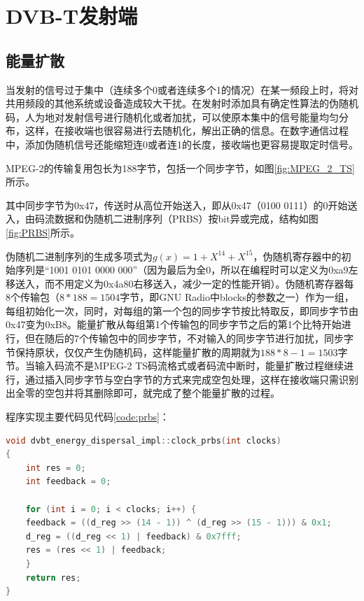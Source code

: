 \chapter{DVB-T发射端}
	\section{能量扩散}
		\par 当发射的信号过于集中（连续多个0或者连续多个1的情况）在某一频段上时，将对共用频段的其他系统或设备造成较大干扰。在发射时添加具有确定性算法的伪随机码，人为地对发射信号进行随机化或者加扰，可以使原本集中的信号能量均匀分布，这样，在接收端也很容易进行去随机化，解出正确的信息。在数字通信过程中，添加伪随机信号还能缩短连0或者连1的长度，接收端也更容易提取定时信号。
		\par MPEG-2的传输复用包长为188字节，包括一个同步字节，如图\ref{fig:MPEG_2_TS}所示。
		
		\par 其中同步字节为0x47，传送时从高位开始送入，即从0x47（0100 0111）的0开始送入，由码流数据和伪随机二进制序列（PRBS）按bit异或完成，结构如图\ref{fig:PRBS}所示。
		
		\par 伪随机二进制序列的生成多项式为$g(x)=1+X^{14}+X^{15}$，伪随机寄存器中的初始序列是“1001 0101 0000 000”（因为最后为全0，所以在编程时可以定义为0xa9左移送入，而不用定义为0x4a80右移送入，减少一定的性能开销）。伪随机寄存器每8个传输包（$8*188=1504$字节，即GNU Radio中blocks的参数之一）作为一组，每组初始化一次，同时，对每组的第一个包的同步字节按比特取反，即同步字节由0x47变为0xB8。能量扩散从每组第1个传输包的同步字节之后的第1个比特开始进行，但在随后的7个传输包中的同步字节，不对输入的同步字节进行加扰，同步字节保持原状，仅仅产生伪随机码，这样能量扩散的周期就为$188*8-1=1503$字节。当输入码流不是MPEG-2 TS码流格式或者码流中断时，能量扩散过程继续进行，通过插入同步字节与空白字节的方式来完成空包处理，这样在接收端只需识别出全零的空包并将其删除即可，就完成了整个能量扩散的过程。
		\par 程序实现主要代码见代码\ref{code:prbs}：
		\begin{lstlisting}[caption = {能量扩散}, label = {code:prbs}, language = C++ ]
void dvbt_energy_dispersal_impl::clock_prbs(int clocks)
{
	int res = 0;
	int feedback = 0;

	for (int i = 0; i < clocks; i++) {
	feedback = ((d_reg >> (14 - 1)) ^ (d_reg >> (15 - 1))) & 0x1;
	d_reg = ((d_reg << 1) | feedback) & 0x7fff;
	res = (res << 1) | feedback;
	}
	return res;
}
		\end{lstlisting}
